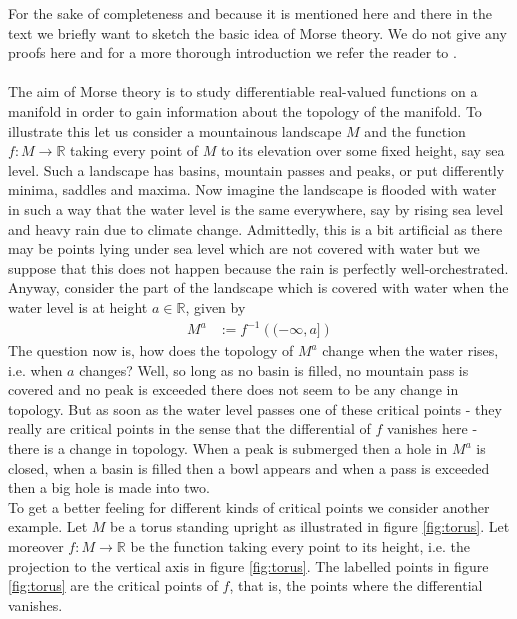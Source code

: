 For the sake of completeness and because it is mentioned here and there in the text we briefly want to sketch the basic idea of Morse theory. We do not give any proofs here and for a more thorough introduction we refer the reader to \cite{e6be9f07}.
\\\\
The aim of Morse theory is to study differentiable real-valued functions on a manifold in order to gain information about the topology of the manifold. To illustrate this let us consider a mountainous landscape $M$ and the function $f \colon M \to \mathbb{R}$ taking every point of $M$ to its elevation over some fixed height, say sea level. Such a landscape has basins, mountain passes and peaks, or put differently minima, saddles and maxima. Now imagine the landscape is flooded with water in such a way that the water level is the same everywhere, say by rising sea level and heavy rain due to climate change. Admittedly, this is a bit artificial as there may be points lying under sea level which are not covered with water but we suppose that this does not happen because the rain is perfectly well-orchestrated. Anyway, consider the part of the landscape which is covered with water when the water level is at height $a \in \mathbb{R}$, given by
\begin{align*}
  M^{a}
  &:=
  f^{-1}
  \left(
    (-\infty,a]
  \right)
\end{align*}
The question now is, how does the topology of $M^{a}$ change when the water rises, i.e. when $a$ changes? Well, so long as no basin is filled, no mountain pass is covered and no peak is exceeded there does not seem to be any change in topology. But as soon as the water level passes one of these critical points - they really are critical points in the sense that the differential of $f$ vanishes here - there is a change in topology. When a peak is submerged then a hole in $M^{a}$ is closed, when a basin is filled then a {\glqq}bowl{\grqq} appears and when a pass is exceeded then a big hole is made into two.
\\
To get a better feeling for different kinds of critical points we consider another example. Let $M$ be a torus standing upright as illustrated in figure \ref{fig:torus}. Let moreover $f \colon M \to \mathbb{R}$ be the function taking every point to its height, i.e. the projection to the vertical axis in figure \ref{fig:torus}. The labelled points in figure \ref{fig:torus} are the critical points of $f$, that is, the points where the differential vanishes.
